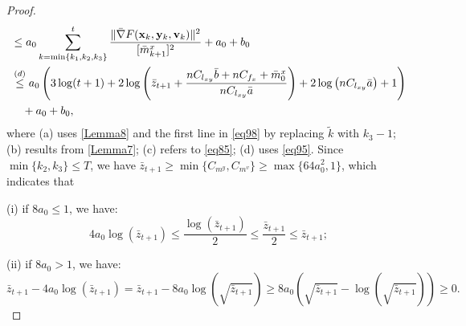 \documentclass{article}
\theoremstyle{plain}
\theoremstyle{definition}
\theoremstyle{remark}
\begin{document}
\begin{proof}
\begin{align}
&\leq a_0 \sum_{k=\min\{k_1,k_2, k_3\}}^t \frac{\| \bar{\nabla} F(\mathbf{x}_{k},\mathbf{y}_{k},\mathbf{v}_{k})\|^2}{[\bar{m}^x_{k+1}]^2} + a_0 + b_0\notag \\
&\overset{(d)}{\leq} a_0 \left(3 \log(t + 1) + 2 \log \left(  \bar{z}_{t+1} + \frac{nC_{l_{xy}} \bar{b} + nC_{f_x} + \bar{m}^x_0}{nC_{l_{xy}} \bar{a}} \right)+2 \log \left( nC_{l_{xy}} \bar{a}\right) + 1\right)\nonumber\\
&\quad+ a_0 + b_0,\label{eq100}
\end{align}
where (a) uses \cref{Lemma8} and the first line in \cref{eq98} by replacing $\tilde{k}$ with $k_3 - 1$; (b) results from \cref{Lemma7}; (c) refers to \cref{eq85}; (d) uses \cref{eq95}. Since $\min\{k_2, k_3\} \leq T$, we have $\bar{z}_{t+1} \geq \min\{C_{m^y}, C_{m^v}\} \geq \max\{64a_0^2, 1\}$, which indicates that

(i) if $8a_0 \leq 1$, we have:
\begin{equation}
    4a_0 \log(\bar{z}_{t+1}) \leq \frac{\log(\bar{z}_{t+1})}{2} \leq \frac{\bar{z}_{t+1}}{2} \leq \bar{z}_{t+1};\label{eq101}
\end{equation}

(ii) if $8a_0 > 1$, we have:
\begin{equation}
\bar{z}_{t+1} - 4a_0 \log(\bar{z}_{t+1}) = \bar{z}_{t+1} - 8a_0 \log(\sqrt{\bar{z}_{t+1}}) \geq 8a_0 \left(\sqrt{\bar{z}_{t+1}} - \log(\sqrt{\bar{z}_{t+1}})\right) \geq 0.\label{eq102}
\end{equation}


\end{proof}
\end{document}
